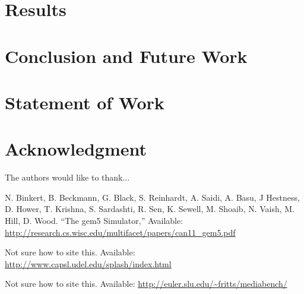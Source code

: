 \documentclass[journal]{IEEEtran}
\begin{document}
\section{Results}


\section{Conclusion and Future Work}


\section{Statement of Work}



\section*{Acknowledgment}
The authors would like to thank...

\begin{thebibliography}{1}
  N. Binkert, B. Beckmann, G. Black, S. Reinhardt, A. Saidi, A. Basu, J Hestness, D. Hower, T. Krishna, S. Sardashti, R. Sen, K. Sewell, M. Shoaib, N. Vaish, M. Hill, D. Wood.
  ``The gem5 Simulator,'' 
  Available: \url{http://research.cs.wisc.edu/multifacet/papers/can11_gem5.pdf}

  Not sure how to site this.
  Available: \url{http://www.capsl.udel.edu/splash/index.html} 
  
  Not sure how to site this.
  Available: \url{http://euler.slu.edu/~fritts/mediabench/} 

\end{thebibliography}

\end{document}
